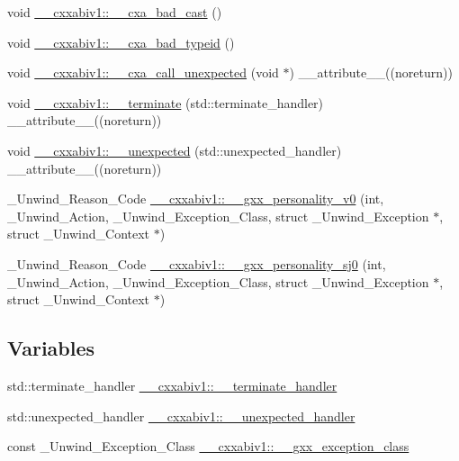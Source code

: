 \begin{DoxyCompactItemize}
\item 
void \hyperlink{namespace____cxxabiv1_aa9458fba4be0ba058e92e1edef17795d}{\-\_\-\-\_\-cxxabiv1\-::\-\_\-\-\_\-cxa\-\_\-bad\-\_\-cast} ()
\item 
void \hyperlink{namespace____cxxabiv1_a9bf53abfb101b3b910debe88f2d60711}{\-\_\-\-\_\-cxxabiv1\-::\-\_\-\-\_\-cxa\-\_\-bad\-\_\-typeid} ()
\item 
void \hyperlink{namespace____cxxabiv1_a78b2cf246910df85e52f4c285e23acf1}{\-\_\-\-\_\-cxxabiv1\-::\-\_\-\-\_\-cxa\-\_\-call\-\_\-unexpected} (void $\ast$) \-\_\-\-\_\-attribute\-\_\-\-\_\-((noreturn))
\item 
void \hyperlink{namespace____cxxabiv1_a072cc5e0906483f9e3b729b8d8e05843}{\-\_\-\-\_\-cxxabiv1\-::\-\_\-\-\_\-terminate} (std\-::terminate\-\_\-handler) \-\_\-\-\_\-attribute\-\_\-\-\_\-((noreturn))
\item 
void \hyperlink{namespace____cxxabiv1_a7ae848cfeb6c720e8924f78ee301a7af}{\-\_\-\-\_\-cxxabiv1\-::\-\_\-\-\_\-unexpected} (std\-::unexpected\-\_\-handler) \-\_\-\-\_\-attribute\-\_\-\-\_\-((noreturn))
\item 
\-\_\-\-Unwind\-\_\-\-Reason\-\_\-\-Code \hyperlink{namespace____cxxabiv1_addf73d016a9a97786edceb50a6915109}{\-\_\-\-\_\-cxxabiv1\-::\-\_\-\-\_\-gxx\-\_\-personality\-\_\-v0} (int, \-\_\-\-Unwind\-\_\-\-Action, \-\_\-\-Unwind\-\_\-\-Exception\-\_\-\-Class, struct \-\_\-\-Unwind\-\_\-\-Exception $\ast$, struct \-\_\-\-Unwind\-\_\-\-Context $\ast$)
\item 
\-\_\-\-Unwind\-\_\-\-Reason\-\_\-\-Code \hyperlink{namespace____cxxabiv1_a2c5fdee37427781baf9669f4ba4c5f25}{\-\_\-\-\_\-cxxabiv1\-::\-\_\-\-\_\-gxx\-\_\-personality\-\_\-sj0} (int, \-\_\-\-Unwind\-\_\-\-Action, \-\_\-\-Unwind\-\_\-\-Exception\-\_\-\-Class, struct \-\_\-\-Unwind\-\_\-\-Exception $\ast$, struct \-\_\-\-Unwind\-\_\-\-Context $\ast$)
\end{DoxyCompactItemize}
\subsection*{Variables}
\begin{DoxyCompactItemize}
\item 
std\-::terminate\-\_\-handler \hyperlink{namespace____cxxabiv1_a0128b535d39d6d6df146d8675585a634}{\-\_\-\-\_\-cxxabiv1\-::\-\_\-\-\_\-terminate\-\_\-handler}
\item 
std\-::unexpected\-\_\-handler \hyperlink{namespace____cxxabiv1_a47e07d381357c2eb2b92436d7ff86f4b}{\-\_\-\-\_\-cxxabiv1\-::\-\_\-\-\_\-unexpected\-\_\-handler}
\item 
const \-\_\-\-Unwind\-\_\-\-Exception\-\_\-\-Class \hyperlink{namespace____cxxabiv1_a80b0f73d26cf8434d330a3a578862519}{\-\_\-\-\_\-cxxabiv1\-::\-\_\-\-\_\-gxx\-\_\-exception\-\_\-class}
\end{DoxyCompactItemize}
